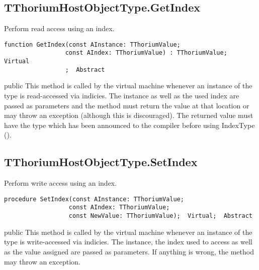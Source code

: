 \subsection{TThoriumHostObjectType.GetIndex}
\label{thoriumcorepkg:thorium:tthoriumhostobjecttype:getindex}
\begin{FPCList}
\Synopsis
Perform read access using an index.\Declaration 

\begin{verbatim}
function GetIndex(const AInstance: TThoriumValue;
                 const AIndex: TThoriumValue) : TThoriumValue;  Virtual
                 ;  Abstract
\end{verbatim}
\Visibility
public
\Description
This method is called by the virtual machine whenever an instance of the type is read-accessed via indicies. The instance as well as the used index are passed as parameters and the method must return the value at that location or may throw an exception (although this is discouraged). The returned value must have the type which has been announced to the compiler before using IndexType (\pageref{thoriumcorepkg:thorium:tthoriumhostobjecttype:indextype}).\end{FPCList}
\subsection{TThoriumHostObjectType.SetIndex}
\label{thoriumcorepkg:thorium:tthoriumhostobjecttype:setindex}
\begin{FPCList}
\Synopsis
Perform write access using an index.\Declaration 

\begin{verbatim}
procedure SetIndex(const AInstance: TThoriumValue;
                  const AIndex: TThoriumValue;
                  const NewValue: TThoriumValue);  Virtual;  Abstract
\end{verbatim}
\Visibility
public
\Description
This method is called by the virtual machine whenever an instance of the type is write-accessed via indicies. The instance, the index used to access as well as the value assigned are passed as parameters. If anything is wrong, the method may throw an exception.\end{FPCList}
